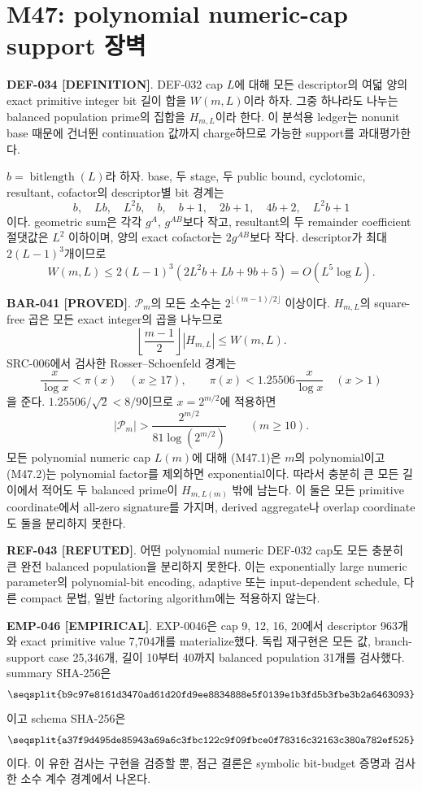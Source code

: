 \documentclass[11pt]{article}
\newcommand{\claimstatus}[2]{\textbf{#1 [#2]}}
\begin{document}
\section{M47: polynomial numeric-cap support 장벽}

\claimstatus{DEF-034}{DEFINITION}.
DEF-032 cap \(L\)에 대해 모든 descriptor의 여덟 양의 exact primitive
integer bit 길이 합을 \(W(m,L)\)이라 하자. 그중 하나라도 나누는
balanced population prime의 집합을 \(H_{m,L}\)이라 한다. 이 분석용
ledger는 nonunit base 때문에 건너뛴 continuation 값까지 charge하므로
가능한 support를 과대평가한다.

\(b=\operatorname{bitlength}(L)\)라 하자. base, 두 stage, 두 public
bound, cyclotomic, resultant, cofactor의 descriptor별 bit 경계는
\[
b,\quad Lb,\quad L^2b,\quad b,\quad b+1,\quad
2b+1,\quad4b+2,\quad L^2b+1
\]
이다. geometric sum은 각각 \(g^A\), \(g^{AB}\)보다 작고,
resultant의 두 remainder coefficient 절댓값은 \(L^2\) 이하이며,
양의 exact cofactor는 \(2g^{AB}\)보다 작다. descriptor가 최대
\(2(L-1)^3\)개이므로
\[
W(m,L)\le
2(L-1)^3(2L^2b+Lb+9b+5)
=O(L^5\log L).
\tag{M47.1}
\]

\claimstatus{BAR-041}{PROVED}.
\(\mathcal P_m\)의 모든 소수는
\(2^{\lfloor(m-1)/2\rfloor}\) 이상이다. \(H_{m,L}\)의 square-free
곱은 모든 exact integer의 곱을 나누므로
\[
\left\lfloor\frac{m-1}{2}\right\rfloor |H_{m,L}|
\le W(m,L).
\]
SRC-006에서 검사한 Rosser--Schoenfeld 경계는
\[
\frac{x}{\log x}<\pi(x)\quad(x\ge17),\qquad
\pi(x)<1.25506\frac{x}{\log x}\quad(x>1)
\]
을 준다. \(1.25506/\sqrt2<8/9\)이므로 \(x=2^{m/2}\)에 적용하면
\[
|\mathcal P_m|>
\frac{2^{m/2}}{81\log(2^{m/2})}
\qquad(m\ge10).
\tag{M47.2}
\]
모든 polynomial numeric cap \(L(m)\)에 대해 (M47.1)은 \(m\)의
polynomial이고 (M47.2)는 polynomial factor를 제외하면
exponential이다. 따라서 충분히 큰 모든 길이에서 적어도 두 balanced
prime이 \(H_{m,L(m)}\) 밖에 남는다. 이 둘은 모든 primitive
coordinate에서 all-zero signature를 가지며, derived aggregate나
overlap coordinate도 둘을 분리하지 못한다.

\claimstatus{REF-043}{REFUTED}.
어떤 polynomial numeric DEF-032 cap도 모든 충분히 큰 완전 balanced
population을 분리하지 못한다. 이는 exponentially large numeric
parameter의 polynomial-bit encoding, adaptive 또는 input-dependent
schedule, 다른 compact 문법, 일반 factoring algorithm에는 적용하지
않는다.

\claimstatus{EMP-046}{EMPIRICAL}.
EXP-0046은 cap 9, 12, 16, 20에서 descriptor 963개와 exact primitive
value 7,704개를 materialize했다. 독립 재구현은 모든 값,
branch-support case 25,346개, 길이 10부터 40까지 balanced population
31개를 검사했다. summary SHA-256은
\[
\texttt{\seqsplit{b9c97e8161d3470ad61d20fd9ee8834888e5f0139e1b3fd5b3fbe3b2a6463093}}
\]
이고 schema SHA-256은
\[
\texttt{\seqsplit{a37f9d495de85943a69a6c3fbc122c9f09fbce0f78316c32163c380a782ef525}}
\]
이다. 이 유한 검사는 구현을 검증할 뿐, 점근 결론은 symbolic
bit-budget 증명과 검사한 소수 계수 경계에서 나온다.
\end{document}
